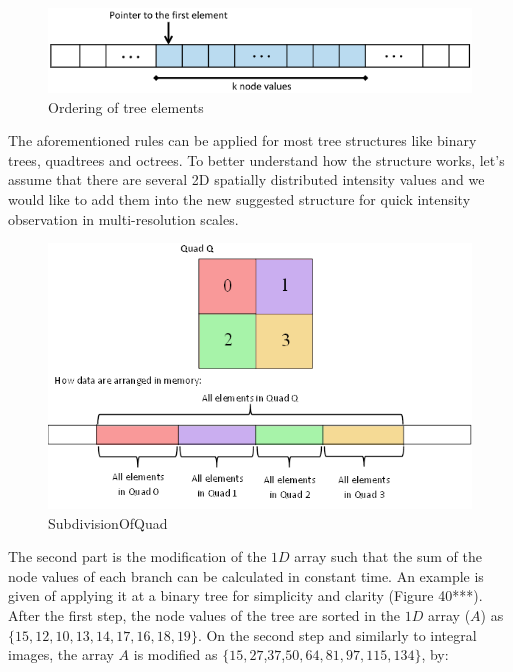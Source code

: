\documentclass{subfiles}
\begin{document}
\begin{figure}[!htbp]
	\centering
	\includegraphics[width=5.5in]{img/IntegralTreeMainIdea}
	\caption{Ordering of tree elements}
	\label{fig:IntegralTreeMainIdea}
\end{figure}

\par The aforementioned rules can be applied for most tree structures like binary trees, quadtrees and octrees. To better understand how the structure works, let’s assume that there are several 2D spatially distributed intensity values and we would like to add them into the new suggested structure for quick intensity observation in multi-resolution scales. 


\begin{figure}[!htbp]
	\centering
	\includegraphics[width=5.5in]{img/IntegralTree}
	\caption{SubdivisionOfQuad}
	\label{fig:IntegralTreeQuads}
\end{figure}

\par The second part is the modification of the $1D$ array such that the sum of the node values of each branch can be calculated in constant time. An example is given of applying it at a binary tree for simplicity and clarity (Figure 40***). After the first step, the node values of the tree are sorted in the $1D$ array ($A$) as $\{15, 12, 10, 13, 14, 17, 16, 18, 19\}$. On the second step and similarly to integral images, the array $A$ is modified as $\{15, 27$,$37$,$50, 64, 81, 97, 115, 134\}$, by:
\end{document}
